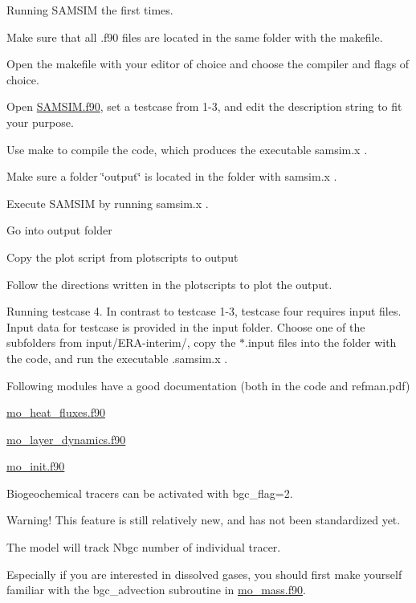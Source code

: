 Running SAMSIM the first times.
\begin{DoxyItemize}
\item Make sure that all .f90 files are located in the same folder with the makefile.
\item Open the makefile with your editor of choice and choose the compiler and flags of choice.
\item Open \hyperlink{SAMSIM_8f90}{SAMSIM.f90}, set a testcase from 1-\/3, and edit the description string to fit your purpose.
\item Use make to compile the code, which produces the executable samsim.x .
\item Make sure a folder \char`\"{}output\char`\"{} is located in the folder with samsim.x .
\item Execute SAMSIM by running samsim.x .
\item Go into output folder
\item Copy the plot script from plotscripts to output
\item Follow the directions written in the plotscripts to plot the output.
\end{DoxyItemize}

Running testcase 4. In contrast to testcase 1-\/3, testcase four requires input files. Input data for testcase is provided in the input folder. Choose one of the subfolders from input/ERA-\/interim/, copy the $\ast$.input files into the folder with the code, and run the executable .samsim.x .

Following modules have a good documentation (both in the code and refman.pdf)
\begin{DoxyItemize}
\item \hyperlink{mo__heat__fluxes_8f90}{mo\_\-heat\_\-fluxes.f90}
\item \hyperlink{mo__layer__dynamics_8f90}{mo\_\-layer\_\-dynamics.f90}
\item \hyperlink{mo__init_8f90}{mo\_\-init.f90}
\end{DoxyItemize}

Biogeochemical tracers can be activated with bgc\_\-flag=2.
\begin{DoxyItemize}
\item Warning! This feature is still relatively new, and has not been standardized yet.
\item The model will track Nbgc number of individual tracer.
\item Especially if you are interested in dissolved gases, you should first make yourself familiar with the bgc\_\-advection subroutine in \hyperlink{mo__mass_8f90}{mo\_\-mass.f90}.
\end{DoxyItemize}

